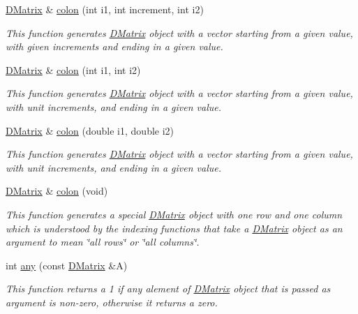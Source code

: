 \begin{DoxyCompactItemize}
\hyperlink{classDMatrix}{DMatrix} \& \hyperlink{classDMatrix_ad79d00fc58e2584963625ecf46ccabee}{colon} (int i1, int increment, int i2)
\begin{DoxyCompactList}\small\item\em This function generates \hyperlink{classDMatrix}{DMatrix} object with a vector starting from a given value, with given increments and ending in a given value. \item\end{DoxyCompactList}\item 
\hyperlink{classDMatrix}{DMatrix} \& \hyperlink{classDMatrix_a1cbcbb56a983edaa8e40dba43df831c0}{colon} (int i1, int i2)
\begin{DoxyCompactList}\small\item\em This function generates \hyperlink{classDMatrix}{DMatrix} object with a vector starting from a given value, with unit increments, and ending in a given value. \item\end{DoxyCompactList}\item 
\hyperlink{classDMatrix}{DMatrix} \& \hyperlink{classDMatrix_a1f79ebd6d8952d215f2792a9c19a0064}{colon} (double i1, double i2)
\begin{DoxyCompactList}\small\item\em This function generates \hyperlink{classDMatrix}{DMatrix} object with a vector starting from a given value, with unit increments, and ending in a given value. \item\end{DoxyCompactList}\item 
\hyperlink{classDMatrix}{DMatrix} \& \hyperlink{classDMatrix_a2987194d90eec1f076a329414ac07278}{colon} (void)
\begin{DoxyCompactList}\small\item\em This function generates a special \hyperlink{classDMatrix}{DMatrix} object with one row and one column which is understood by the indexing functions that take a \hyperlink{classDMatrix}{DMatrix} object as an argument to mean \char`\"{}all rows\char`\"{} or \char`\"{}all columns\char`\"{}. \item\end{DoxyCompactList}\item 
int \hyperlink{classDMatrix_ad90390441283c128e0c64ad67b7a7d16}{any} (const \hyperlink{classDMatrix}{DMatrix} \&A)
\begin{DoxyCompactList}\small\item\em This function returns a 1 if any alement of \hyperlink{classDMatrix}{DMatrix} object that is passed as argument is non-\/zero, otherwise it returns a zero. \item\end{DoxyCompactList}\item 

\end{DoxyCompactItemize}
